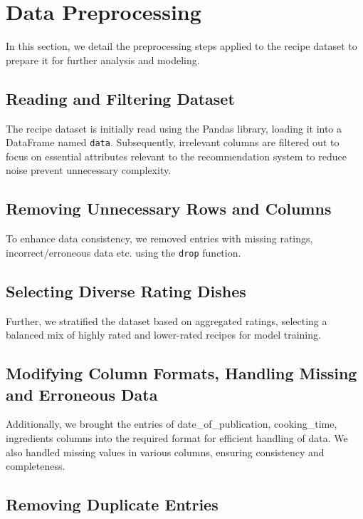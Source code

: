 \documentclass[conference]{IEEEtran}
\begin{document}
\section{Data Preprocessing}

In this section, we detail the preprocessing steps applied to the recipe dataset to prepare it for further analysis and modeling.

\subsection{Reading and Filtering Dataset}

The recipe dataset is initially read using the Pandas library, loading it into a DataFrame named \texttt{data}. Subsequently, irrelevant columns are filtered out to focus on essential attributes relevant to the recommendation system to reduce noise prevent unnecessary complexity.

\subsection{Removing Unnecessary Rows and Columns}

To enhance data consistency, we removed entries with missing ratings, incorrect/erroneous data etc. using the \texttt{drop} function.

\subsection{Selecting Diverse Rating Dishes}

Further, we stratified the dataset based on aggregated ratings, selecting a balanced mix of highly rated and lower-rated recipes for model training.

\subsection{Modifying Column Formats, Handling Missing and Erroneous Data}

 Additionally, we brought the entries of date\_of\_publication, cooking\_time, ingredients  columns into the required format for efficient handling of data. We also handled missing values in various columns, ensuring consistency and completeness.

\subsection{Removing Duplicate Entries}
\end{document}

